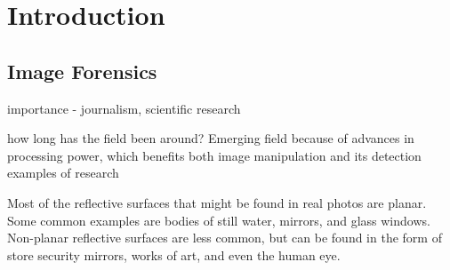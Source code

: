 \section{Introduction}

\subsection{Image Forensics}
importance - journalism, scientific research

how long has the field been around?
Emerging field because of advances in processing power, which benefits both image manipulation and its detection
	examples of research

Most of the reflective surfaces that might be found in real photos are planar. Some common examples are bodies of still water, mirrors, and glass windows. Non-planar reflective surfaces are less common, but can be found in the form of store security mirrors, works of art, and even the human eye.
